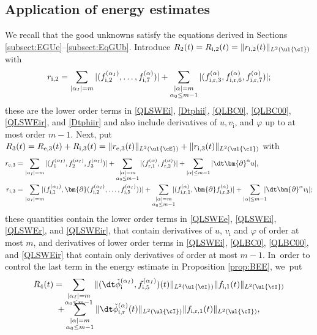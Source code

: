 \subsection{Application of energy estimates}\label{sectAppl}
We recall that the good unknowns satisfy the equations derived in Sections \ref{subsect:EGUe}--\ref{subsect:EqGUb}.
Introduce $R_2(t)=R_{{\rm i},2}(t)=\|r_{{\rm i},2}(t)\|_{L^2(\ul{\cI})}$ with
\[
r_{{\rm i},2} = \sum_{|\alpha_I|=m} |(f_{{\rm i},2}^{(\alpha_I)},\ldots,f_{{\rm i},7}^{(\alpha)})|
+ \sum_{\substack{|\alpha|=m\\\alpha_0\leq m-1}} |(f_{{\rm i,r},3}^{(\alpha)},f_{{\rm i,r},6}^{(\alpha)},f_{{\rm i,r},7}^{(\alpha)})|;
\]
these are the lower order terms in \eqref{QLSWEi}, \eqref{Dtphii}, \eqref{QLBC0}, \eqref{QLBC00}, \eqref{QLSWEir}, and \eqref{Dtphiir}
and also include derivatives of $u,v_\mathrm{i}$, and $\varphi$ up to at most order $m-1$.
Next, put $R_3(t)=R_{{\rm e},3}(t)+R_{{\rm i},3}(t)=\|r_{{\rm e},3}(t)\|_{L^2(\ul{\cE})}+\|r_{{\rm i},3}(t)\|_{L^2(\ul{\cI})}$ with
\begin{align*}
r_{{\rm e},3}
&= \sum_{|\alpha_I|=m} |(f_1^{(\alpha_I)},f_2^{(\alpha_I)},f_3^{(\alpha_I)})|
+ \sum_{\substack{|\alpha|=m\\\alpha_0\leq m-1}} |(f_{{\rm r},1}^{(\alpha)},f_{{\rm r},2}^{(\alpha)})| + \sum_{|\alpha|\leq m-1}|\dt\bm{\partial}^\alpha u|, \\
r_{{\rm i},3}
&= \sum_{|\alpha_I|=m}\hspace*{-2mm} |(f_{{\rm i},1}^{(\alpha_I)},\bm{\partial}(f_{{\rm i},2}^{(\alpha_I)},\ldots,f_{{\rm i},5}^{(\alpha_I)}))|
+ \sum_{\substack{|\alpha|=m\\\alpha_0\leq m-1}}\hspace*{-2mm} |(f_{{\rm i,r},1}^{(\alpha)},\bm{\partial}f_{{\rm i,r},3}^{(\alpha)})|
+ \sum_{|\alpha|\leq m-1}\hspace*{-2mm}|\dt\bm{\partial}^\alpha v_\mathrm{i}|;
\end{align*}
these quantities contain the lower order terms in \eqref{QLSWEe}, \eqref{QLSWEi}, \eqref{QLSWEr}, and \eqref{QLSWEir},
that contain derivatives of $u$, $v_\mathrm{i}$ and $\varphi$ of order at most $m$, and derivatives of lower order terms in
\eqref{QLSWEi}, \eqref{QLBC0}, \eqref{QLBC00}, and \eqref{QLSWEir} that contain only derivatives of order at most $m-1$. In~order to control the last term in the energy estimate in Proposition \ref{prop:BEE}, we~put
\begin{multline*}
R_4(t)
= \sum_{\substack{|\alpha_I|=m\\ \alpha_0\leq m-1}} \|(\dt\check{\phi}_\mathrm{i}^{(\alpha_I)},f_{{\rm i},5}^{(\alpha_I)})(t)\|_{L^2(\ul{\cI})}
\|f_{{\rm i},1}(t)\|_{L^2(\ul{\cI})} \\[-8pt]
+ \sum_{\substack{|\alpha|=m\\ \alpha_0\leq m-1}} \|\dt\check{\phi}_\mathrm{i,r}^{(\alpha)}(t)\|_{L^2(\ul{\cI})} \|f_{{\rm i,r},1}(t)\|_{L^2(\ul{\cI})},
\end{multline*}
